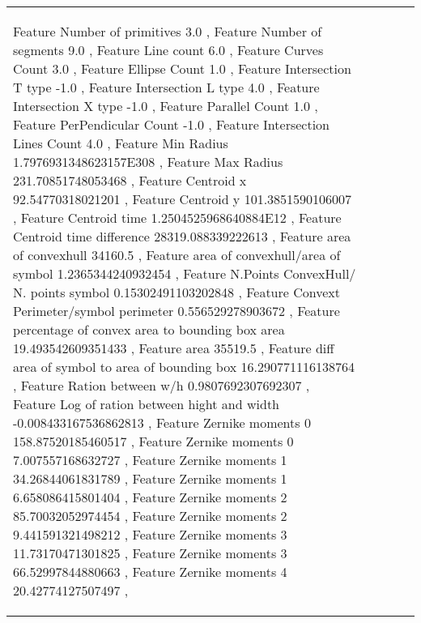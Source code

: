 \begin{landscape}
\begin{scriptsize}
\begin{longtable}{|p{2cm}|p{2cm}|p{2cm}|p{2cm}|p{13cm}|}
   \begin{scriptsize}
   Feature Number of primitives 3.0   ,    Feature Number of segments 9.0   ,    Feature Line count 6.0   ,    Feature Curves Count 3.0   ,    Feature Ellipse Count 1.0   ,    Feature Intersection T type -1.0   ,    Feature Intersection L type 4.0   ,    Feature Intersection X type -1.0   ,    Feature Parallel Count 1.0   ,    Feature PerPendicular Count -1.0   ,    Feature Intersection Lines Count 4.0   ,    Feature Min Radius 1.7976931348623157E308   ,    Feature Max Radius 231.70851748053468   ,    Feature Centroid x 92.54770318021201   ,    Feature Centroid y 101.3851590106007   ,    Feature Centroid time 1.2504525968640884E12   ,    Feature Centroid time difference 28319.088339222613   ,    Feature area of convexhull 34160.5   ,    Feature area of convexhull/area of symbol 1.2365344240932454   ,    Feature N.Points ConvexHull/ N. points symbol 0.15302491103202848   ,    Feature Convext Perimeter/symbol perimeter 0.556529278903672   ,    Feature  percentage of convex area to bounding box area 19.493542609351433   ,    Feature area  35519.5   ,    Feature diff area of symbol to area of bounding box 16.290771116138764   ,    Feature  Ration between w/h  0.9807692307692307   ,    Feature  Log of ration between hight and width -0.008433167536862813   ,    Feature Zernike moments 0 158.87520185460517   ,    Feature Zernike moments 0 7.007557168632727   ,    Feature Zernike moments 1 34.26844061831789   ,    Feature Zernike moments 1 6.658086415801404   ,    Feature Zernike moments 2 85.70032052974454   ,    Feature Zernike moments 2 9.441591321498212   ,    Feature Zernike moments 3 11.73170471301825   ,    Feature Zernike moments 3 66.52997844880663   ,    Feature Zernike moments 4 20.42774127507497   ,    %

\end{scriptsize}
\end{longtable}
\end{scriptsize}
\end{landscape}
